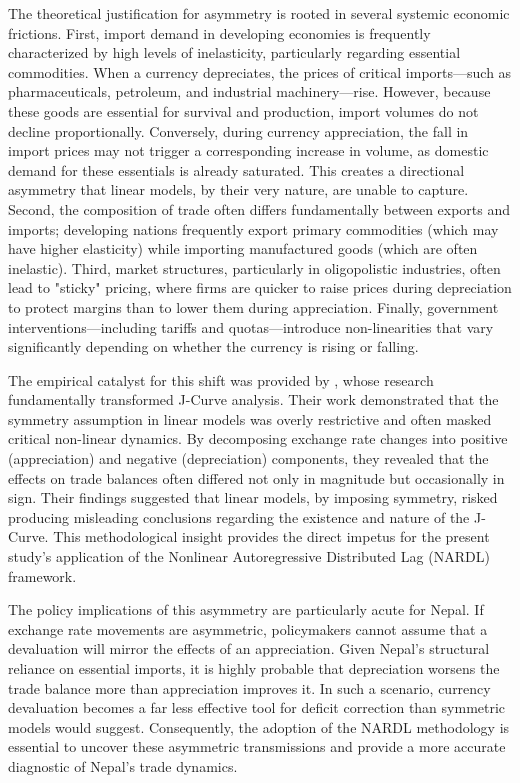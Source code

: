 \documentclass[12pt]{article}
\begin{document}
The theoretical justification for asymmetry is rooted in several systemic economic frictions. First, import demand in developing economies is frequently characterized by high levels of inelasticity, particularly regarding essential commodities. When a currency depreciates, the prices of critical imports—such as pharmaceuticals, petroleum, and industrial machinery—rise. However, because these goods are essential for survival and production, import volumes do not decline proportionally. Conversely, during currency appreciation, the fall in import prices may not trigger a corresponding increase in volume, as domestic demand for these essentials is already saturated. This creates a directional asymmetry that linear models, by their very nature, are unable to capture. Second, the composition of trade often differs fundamentally between exports and imports; developing nations frequently export primary commodities (which may have higher elasticity) while importing manufactured goods (which are often inelastic). Third, market structures, particularly in oligopolistic industries, often lead to "sticky" pricing, where firms are quicker to raise prices during depreciation to protect margins than to lower them during appreciation. Finally, government interventions—including tariffs and quotas—introduce non-linearities that vary significantly depending on whether the currency is rising or falling.

The empirical catalyst for this shift was provided by \textcite{Bahmani-Oskooee2015-ev}, whose research fundamentally transformed J-Curve analysis. Their work demonstrated that the symmetry assumption in linear models was overly restrictive and often masked critical non-linear dynamics. By decomposing exchange rate changes into positive (appreciation) and negative (depreciation) components, they revealed that the effects on trade balances often differed not only in magnitude but occasionally in sign. Their findings suggested that linear models, by imposing symmetry, risked producing misleading conclusions regarding the existence and nature of the J-Curve. This methodological insight provides the direct impetus for the present study’s application of the Nonlinear Autoregressive Distributed Lag (NARDL) framework.

The policy implications of this asymmetry are particularly acute for Nepal. If exchange rate movements are asymmetric, policymakers cannot assume that a devaluation will mirror the effects of an appreciation. Given Nepal's structural reliance on essential imports, it is highly probable that depreciation worsens the trade balance more than appreciation improves it. In such a scenario, currency devaluation becomes a far less effective tool for deficit correction than symmetric models would suggest. Consequently, the adoption of the NARDL methodology is essential to uncover these asymmetric transmissions and provide a more accurate diagnostic of Nepal's trade dynamics.
\end{document}
